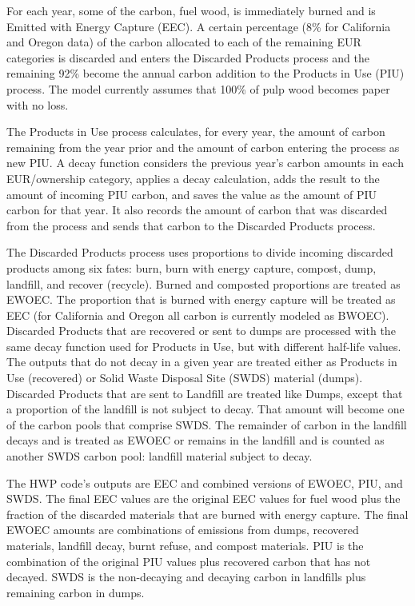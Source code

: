 \documentclass[
]{book}
\begin{document}
For each year, some of the carbon, fuel wood, is immediately burned and is Emitted with Energy Capture (EEC). A certain percentage (8\% for California and Oregon data) of the carbon allocated to each of the remaining EUR categories is discarded and enters the Discarded Products process and the remaining 92\% become the annual carbon addition to the Products in Use (PIU) process. The model currently assumes that 100\% of pulp wood becomes paper with no loss.

The Products in Use process calculates, for every year, the amount of carbon remaining from the year prior and the amount of carbon entering the process as new PIU. A decay function considers the previous year's carbon amounts in each EUR/ownership category, applies a decay calculation, adds the result to the amount of incoming PIU carbon, and saves the value as the amount of PIU carbon for that year. It also records the amount of carbon that was discarded from the process and sends that carbon to the Discarded Products process.

The Discarded Products process uses proportions to divide incoming discarded products among six fates: burn, burn with energy capture, compost, dump, landfill, and recover (recycle). Burned and composted proportions are treated as EWOEC. The proportion that is burned with energy capture will be treated as EEC (for California and Oregon all carbon is currently modeled as BWOEC). Discarded Products that are recovered or sent to dumps are processed with the same decay function used for Products in Use, but with different half-life values. The outputs that do not decay in a given year are treated either as Products in Use (recovered) or Solid Waste Disposal Site (SWDS) material (dumps). Discarded Products that are sent to Landfill are treated like Dumps, except that a proportion of the landfill is not subject to decay. That amount will become one of the carbon pools that comprise SWDS. The remainder of carbon in the landfill decays and is treated as EWOEC or remains in the landfill and is counted as another SWDS carbon pool: landfill material subject to decay.

The HWP code's outputs are EEC and combined versions of EWOEC, PIU, and SWDS. The final EEC values are the original EEC values for fuel wood plus the fraction of the discarded materials that are burned with energy capture. The final EWOEC amounts are combinations of emissions from dumps, recovered materials, landfill decay, burnt refuse, and compost materials. PIU is the combination of the original PIU values plus recovered carbon that has not decayed. SWDS is the non-decaying and decaying carbon in landfills plus remaining carbon in dumps.
\end{document}
